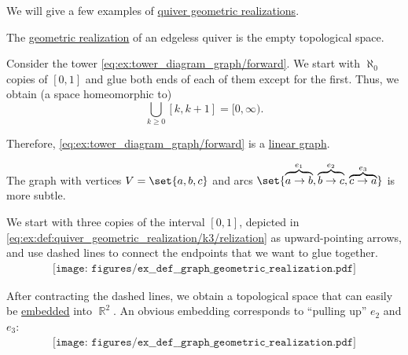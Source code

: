 \begin{example}\label{ex:def:quiver_geometric_realization}
  We will give a few examples of \hyperref[def:quiver_geometric_realization/undirected]{quiver geometric realizations}.

  \begin{thmenum}
     The \hyperref[def:quiver_geometric_realization/undirected]{geometric realization} of an edgeless quiver is the empty topological space.

     Consider the tower \eqref{eq:ex:tower_diagram_graph/forward}. We start with \( \aleph_0 \) copies of \( [0, 1] \) and glue both ends of each of them except for the first. Thus, we obtain (a space homeomorphic to)
    \begin{equation*}
      \bigcup_{k \geq 0} [k, k + 1] = [0, \infty).
    \end{equation*}

    Therefore, \eqref{eq:ex:tower_diagram_graph/forward} is a \hyperref[def:quiver_geometric_realization/linear]{linear graph}.

     The graph with vertices \( V = \set{ a, b, c } \) and arcs \( \set{ \overbrace{a \to b}^{e_1}, \overbrace{b \to c}^{e_2}, \overbrace{c \to a}^{e_3} } \) is more subtle.

    We start with three copies of the interval \( [0, 1] \), depicted in \eqref{eq:ex:def:quiver_geometric_realization/k3/relization} as upward-pointing arrows, and use dashed lines to connect the endpoints that we want to glue together.
    \begin{equation}\label{eq:ex:def:quiver_geometric_realization/k3/relization}
      \begin{aligned}
        \texttt{[image: figures/ex\_\_def\_\_graph\_geometric\_realization.pdf]}
      \end{aligned}
    \end{equation}

    After contracting the dashed lines, we obtain a topological space that can easily be \hyperref[def:quiver_geometric_realization/embedding]{embedded} into \( \BbbR^2 \). An obvious embedding corresponds to \enquote{pulling up} \( e_2 \) and \( e_3 \):
    \begin{equation}\label{eq:ex:def:quiver_geometric_realization/k3/embedding}
      \begin{aligned}
        \texttt{[image: figures/ex\_\_def\_\_graph\_geometric\_realization.pdf]}
      \end{aligned}
    \end{equation}


\end{thmenum}
\end{example}
